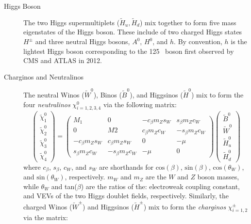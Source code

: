 	\begin{description}
	\item[Higgs Boson] The two Higgs supermultiplets ($\tilde{H}_u,\tilde{H}_d$) mix together to form five mass eigenstates of the Higgs boson. These include of two charged Higgs states $H^{\pm}$ and three neutral Higgs bosons, $A^0$, $H^0$, and $h$. By convention, $h$ is the lightest Higgs boson corresponding to the 125 \gev\ boson first observed by \ac{CMS} and \ac{ATLAS} in 2012.
	\item[Charginos and Neutralinos] The neutral Winos ($\tilde{W}^0$), Binos ($\tilde{B}^0$), and Higgsinos ($\tilde{H}^0$) mix to form the four \textit{neutralinos} $\chi^0_{i=1,2,3,4}$ via the following matrix:
	\begin{equation}
	\begin{pmatrix} 
		\tilde{\chi}_1^0 \\ 
		\tilde{\chi}_2^0 \\ 
		\tilde{\chi}_3^0 \\ 
		\tilde{\chi}_4^0 
	\end{pmatrix} 
	 =
	\begin{pmatrix} 
		M_1                        & 0                           & -c_{\beta}m_Zs_W & s_{\beta}m_Zc_W \\
		0                             & M2                        & c_{\beta}m_Zc_W  & -s_{\beta}m_Zc_W \\
		-c_{\beta}m_Zs_W & c_{\beta}m_Zs_W & 0                            & -\mu                        \\
		s_{\beta}m_Zc_W & -s_{\beta}m_Zc_W & -\mu                       & 0                             
	\end{pmatrix}
	\begin{pmatrix} 
		\tilde{B}^0 \\ 
		\tilde{W}^0 \\ 
		\tilde{H}_u^0 \\ 
		\tilde{H}_d^0 
	\end{pmatrix} 
	\end{equation}
	where $c_{\beta}$, $s_{\beta}$, $c_{W}$, and $s_{W}$ are shorthands for $\mathrm{cos}(\beta)$, $\mathrm{sin}(\beta)$, $\mathrm{cos}(\theta_W)$, and $\mathrm{sin}(\theta_W)$, respectively. $m_W$ and $m_Z$ are the $W$ and $Z$ boson masses, while $\theta_W$ and tan($\beta$) are the ratios of the: electroweak coupling constant, and \acp{VEV} of the two Higgs doublet fields, respectively. 
	Similarly, the charged Winos ($\tilde{W}^{\pm}$) and Higgsinos ($\tilde{H}^{\pm}$) mix to form the \textit{charginos} $\chi^{\pm}_{i=1,2}$ via the matrix:

\end{description}
